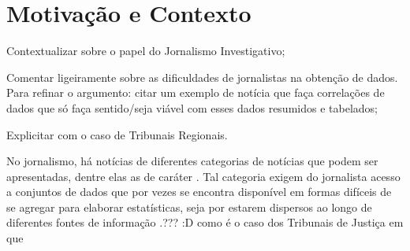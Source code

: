 \section{Motivação e Contexto~\label{sec:Motivação-e-Contexto}}

\begin{todolist}
    \item Contextualizar sobre o papel do Jornalismo Investigativo;
    \item Comentar ligeiramente sobre as dificuldades de jornalistas na
          obtenção de dados. Para refinar o argumento: citar um exemplo de
          notícia que faça correlações de dados que só faça sentido/seja viável
          com esses dados resumidos e tabelados;
    \item Explicitar com o caso de Tribunais Regionais.
\end{todolist}

No jornalismo, há notícias de diferentes categorias de notícias que podem ser
apresentadas, dentre elas as de caráter
. Tal categoria exigem do jornalista acesso a conjuntos de dados que
por vezes se encontra disponível em formas difíceis de se agregar para elaborar
estatísticas, seja por estarem dispersos ao longo de diferentes fontes de
informação .??? :D como é o caso dos Tribunais de Justiça em que
